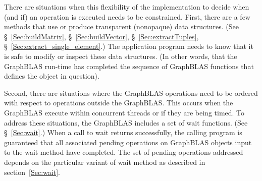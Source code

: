 There are situations when this flexibility of the implementation 
to decide when (and if) an operation is executed needs to be constrained. 
First, there are a few methods that use or produce transparent
(nonopaque) data structures. (See \S~\ref{Sec:buildMatrix}, 
\S~\ref{Sec:buildVector}, \S~\ref{Sec:extractTuples}, 
\S~\ref{Sec:extract_single_element}.) The application program needs to 
know that it is safe to modify or inspect these data structures. 
(In other words, that the GraphBLAS run-time has completed the sequence
of GraphBLAS functions that defines the object in question).

Second, there are situations where the GraphBLAS operations need
to be ordered with respect to operations outside the GraphBLAS. This 
occurs when the GraphBLAS execute within concurrent threads or if they 
are being timed.  To address these situations, the GraphBLAS includes 
a set of {\sf wait} functions. (See \S~\ref{Sec:wait}.) When a 
call to {\sf wait} returns successfully, the calling program is 
guaranteed that all associated pending operations on GraphBLAS 
objects input to the {\sf wait} method have completed. The set 
of pending operations addressed depends on the particular variant 
of {\sf wait} method as described in section~\ref{Sec:wait}.

